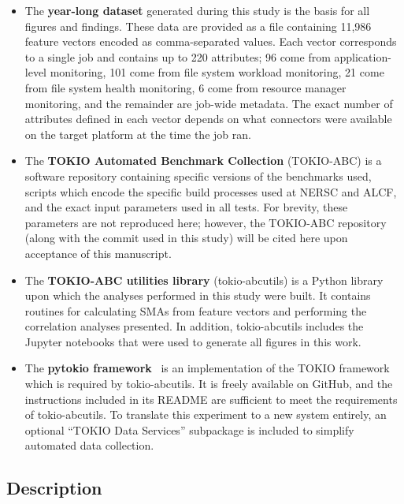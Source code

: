 \begin{itemize}[leftmargin=*]

\item The \textbf{year-long dataset} generated during this study is the basis for all figures and findings.
These data are provided as a file containing 11,986 feature vectors encoded as comma-separated values.
Each vector corresponds to a single job and contains up to 220 attributes; 96 come from application-level monitoring, 101 come from file system workload monitoring, 21 come from file system health monitoring, 6 come from resource manager monitoring, and the remainder are job-wide metadata.
The exact number of attributes defined in each
vector depends on what connectors were available on the target platform at the time the job ran.


\item The \textbf{TOKIO Automated Benchmark Collection} (TOKIO-ABC) is a software repository containing specific versions of the benchmarks used, scripts which encode the specific build processes used at NERSC and ALCF, and the exact input parameters used in all tests.
For brevity, these parameters are not reproduced here; however, the TOKIO-ABC repository (along with the commit used in this study) will be cited here upon acceptance of this manuscript.

\item The \textbf{TOKIO-ABC utilities library} (tokio-abcutils) is a Python library upon which the analyses performed in this study were built.
It contains routines for calculating SMAs from feature vectors and performing the correlation analyses presented.
In addition, tokio-abcutils includes the Jupyter notebooks that were used to generate all figures in this work.

\item The \textbf{pytokio framework}~\cite{Lockwood2018tokio} is an implementation of the TOKIO framework which is required by tokio-abcutils.
It is freely available on GitHub, and the instructions included in its README are sufficient to meet the requirements of tokio-abcutils.
To translate this experiment to a new system entirely, an optional ``TOKIO Data Services'' subpackage is included to simplify automated data collection.

\end{itemize}

\subsection{Description}

